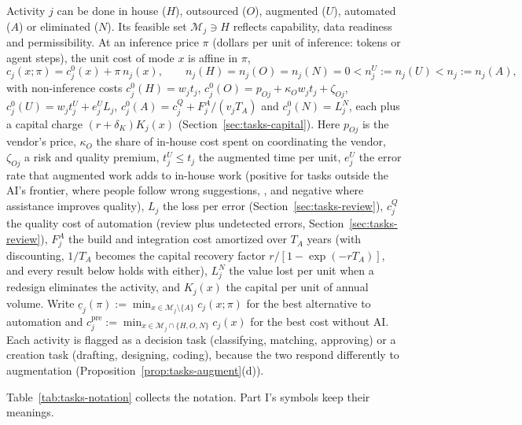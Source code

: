 \begin{assumption}\label{ass:tasks-modes}
Activity $j$ can be done in house ($H$), outsourced ($O$), augmented ($U$), automated ($A$) or eliminated ($N$). Its feasible set $\mathcal M_j\ni H$ reflects capability, data readiness and permissibility. At an inference price $\pi$ (dollars per unit of inference: tokens or agent steps), the unit cost of mode $x$ is affine in $\pi$,
\begin{equation}\label{eq:tasks-cost}
c_j(x;\pi)=c^0_j(x)+\pi\,n_j(x),\qquad n_j(H)=n_j(O)=n_j(N)=0<n^U_j:=n_j(U)<n_j:=n_j(A),
\end{equation}
with non-inference costs $c^0_j(H)=w_jt_j$, $c^0_j(O)=p_{Oj}+\kappa_Ow_jt_j+\zeta_{Oj}$, $c^0_j(U)=w_jt^U_j+e^U_jL_j$, $c^0_j(A)=c^Q_j+F^A_j/(v_jT_A)$ and $c^0_j(N)=L^N_j$, each plus a capital charge $(r+\delta_K)K_j(x)$ (Section~\ref{sec:tasks-capital}). Here $p_{Oj}$ is the vendor's price, $\kappa_O$ the share of in-house cost spent on coordinating the vendor, $\zeta_{Oj}$ a risk and quality premium, $t^U_j\le t_j$ the augmented time per unit, $e^U_j$ the error rate that augmented work adds to in-house work (positive for tasks outside the AI's frontier, where people follow wrong suggestions, \citealp{dellacqua2026navigating}, and negative where assistance improves quality), $L_j$ the loss per error (Section~\ref{sec:tasks-review}), $c^Q_j$ the quality cost of automation (review plus undetected errors, Section~\ref{sec:tasks-review}), $F^A_j$ the build and integration cost amortized over $T_A$ years (with discounting, $1/T_A$ becomes the capital recovery factor $r/[1-\exp(-rT_A)]$, and every result below holds with either), $L^N_j$ the value lost per unit when a redesign eliminates the activity, and $K_j(x)$ the capital per unit of annual volume. Write $\underline c_j(\pi):=\min_{x\in\mathcal M_j\setminus\{A\}}c_j(x;\pi)$ for the best alternative to automation and $c^{\mathrm{pre}}_j:=\min_{x\in\mathcal M_j\cap\{H,O,N\}}c_j(x)$ for the best cost without AI. Each activity is flagged as a decision task (classifying, matching, approving) or a creation task (drafting, designing, coding), because the two respond differently to augmentation (Proposition~\ref{prop:tasks-augment}(d)).
\end{assumption}

Table~\ref{tab:tasks-notation} collects the notation. Part I's symbols keep their meanings.

